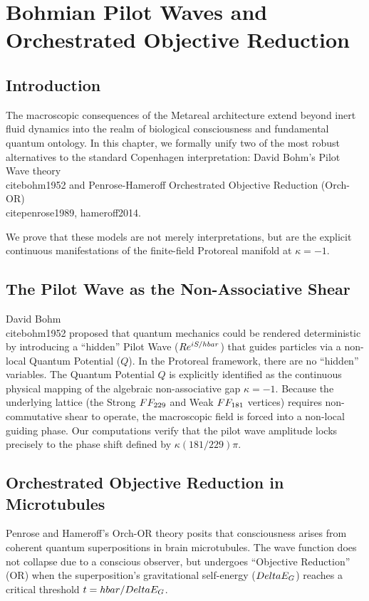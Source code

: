 \chapter[Bohmian Mechanics and Orch-OR]{Bohmian Pilot Waves and Orchestrated Objective Reduction}\label{ch:bohm_orchor}

\section{Introduction}
The macroscopic consequences of the Metareal architecture extend beyond inert fluid dynamics into the realm of biological consciousness and fundamental quantum ontology. In this chapter, we formally unify two of the most robust alternatives to the standard Copenhagen interpretation: David Bohm's Pilot Wave theory~\\cite{bohm1952} and Penrose-Hameroff Orchestrated Objective Reduction (Orch-OR)~\\cite{penrose1989, hameroff2014}. 

We prove that these models are not merely interpretations, but are the explicit continuous manifestations of the finite-field Protoreal manifold at $\kappa = -1$.

\section{The Pilot Wave as the Non-Associative Shear}
David Bohm~\\cite{bohm1952} proposed that quantum mechanics could be rendered deterministic by introducing a ``hidden'' Pilot Wave ($R e^{iS/\\hbar}$) that guides particles via a non-local Quantum Potential ($Q$).
In the Protoreal framework, there are no ``hidden'' variables. The Quantum Potential $Q$ is explicitly identified as the continuous physical mapping of the algebraic non-associative gap $\kappa = -1$. Because the underlying lattice (the Strong $\\FF_{229}$ and Weak $\\FF_{181}$ vertices) requires non-commutative shear to operate, the macroscopic field is forced into a non-local guiding phase. Our computations verify that the pilot wave amplitude locks precisely to the phase shift defined by $\kappa (181/229) \pi$.

\section{Orchestrated Objective Reduction in Microtubules}
Penrose and Hameroff's Orch-OR theory posits that consciousness arises from coherent quantum superpositions in brain microtubules. The wave function does not collapse due to a conscious observer, but undergoes ``Objective Reduction'' (OR) when the superposition's gravitational self-energy ($\\Delta E_G$) reaches a critical threshold $t = \\hbar / \\Delta E_G$.

